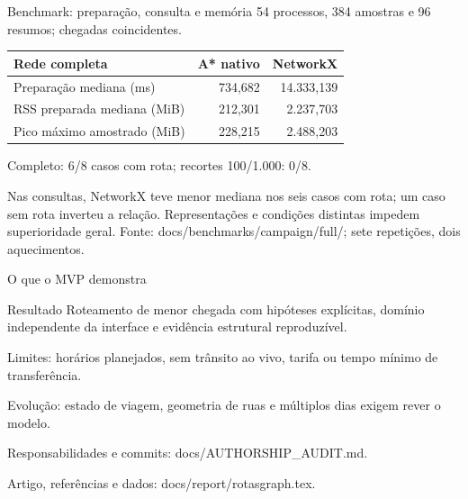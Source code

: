 \documentclass[aspectratio=169,11pt]{beamer}
\begin{document}
\begin{frame}{Benchmark: preparação, consulta e memória}
\small
54 processos, 384 amostras e 96 resumos; chegadas coincidentes.\par\smallskip
\begin{tabularx}{\textwidth}{@{}Xrr@{}}
\toprule Rede completa & A* nativo & NetworkX \\
\midrule
Preparação mediana (ms) & 734,682 & 14.333,139 \\
RSS preparada mediana (MiB) & 212,301 & 2.237,703 \\
Pico máximo amostrado (MiB) & 228,215 & 2.488,203 \\
\bottomrule
\end{tabularx}
\smallskip
Completo: 6/8 casos com rota; recortes 100/1.000: 0/8.\par\smallskip
Nas consultas, NetworkX teve menor mediana nos seis casos com rota; um caso sem rota inverteu a relação. Representações e condições distintas impedem superioridade geral.
\vfill\tiny Fonte: docs/benchmarks/campaign/full/; sete repetições, dois aquecimentos.
\end{frame}
\begin{frame}{O que o MVP demonstra}
\begin{block}{Resultado}
Roteamento de menor chegada com hipóteses explícitas, domínio independente da interface e evidência estrutural reproduzível.
\end{block}
\medskip
Limites: horários planejados, sem trânsito ao vivo, tarifa ou tempo mínimo de transferência.\par\medskip
Evolução: estado de viagem, geometria de ruas e múltiplos dias exigem rever o modelo.\par\medskip
\small Responsabilidades e commits: docs/AUTHORSHIP\_AUDIT.md.\par
Artigo, referências e dados: docs/report/rotasgraph.tex.
\end{frame}
\end{document}
